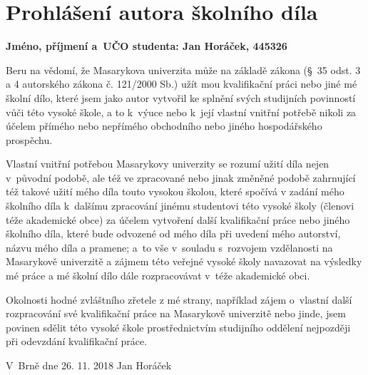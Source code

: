 \documentclass[12pt,a4paper]{article}
\begin{document}
\pagestyle{empty}


\setlength{\parindent}{0cm}
\setlength{\parskip}{3mm plus2pt minus2pt}
\setmainfont[Ligatures=TeX]{TeX Gyre Pagella}

\section*{Prohlášení autora školního díla}

\textbf{Jméno, příjmení a~UČO studenta: Jan Horáček, 445326}

Beru na vědomí, že Masarykova univerzita může na základě zákona (§~35 odst.
3 a 4 autorského zákona č. 121/2000 Sb.) užít mou kvalifikační práci nebo jiné
mé školní dílo, které jsem jako autor vytvořil ke splnění svých studijních
povinností vůči této vysoké škole, a to k~výuce nebo k~její vlastní vnitřní
potřebě nikoli za účelem přímého nebo nepřímého obchodního nebo jiného
hospodářského prospěchu.

Vlastní vnitřní potřebou Masarykovy univerzity se rozumí užití díla nejen
v původní podobě, ale též ve zpracované nebo jinak změněné podobě zahrnující
též takové užití mého díla touto vysokou školou, které spočívá v zadání mého
školního díla k~dalšímu zpracování jinému studentovi této vysoké školy
(členovi téže akademické obce) za účelem vytvoření další kvalifikační práce
nebo jiného školního díla, které bude odvozené od mého díla při uvedení mého
autorství, názvu mého díla a pramene; a~to vše v~souladu s~rozvojem
vzdělanosti na Masarykově univerzitě a zájmem této veřejné vysoké školy
navazovat na výsledky mé práce a mé školní dílo dále rozpracovávat v~téže
akademické obci.

Okolnosti hodné zvláštního zřetele z mé strany, například zájem o~vlast\-ní
další rozpracování své kvalifikační práce na Masarykově univerzitě nebo
jinde, jsem povinen sdělit této vysoké škole prostřednictvím studijního
oddělení nejpozději při odevzdání kvalifikační práce.

\vskip 2cm
V~Brně dne 26. 11. 2018
\hfill
Jan Horáček
\par\vfill
\end{document}
